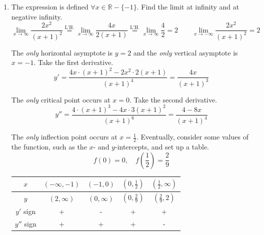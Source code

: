 \documentclass[a4paper, 12pt]{article}
\begin{document}
\begin{enumerate}[leftmargin=*,label=\textbf{\arabic*.}]
\begin{enumerate}[leftmargin=*,label=\textbf{\arabic*.}]
If $\displaystyle \ln(L)=-\frac16$, then $\boxed{L= e^{\textstyle-\frac16}}$.
\begin{enumerate}[leftmargin=*,label=\textbf{\alph*.}]
\item Rewrite the equation: $\dfrac xy=\cos(\pi xy)\implies x=y\cos(\pi xy)$.

Differentiate each side.
\[1=y'\cdot\cos(\pi xy)+y\cdot(-\sin(\pi xy))\cdot\pi(1\cdot y+xy')\]
\[1=y'\cos(\pi xy)-\pi y^2\sin(\pi xy)-\pi xyy'\sin(\pi xy)\]
\[1+\pi y^2\sin(\pi xy)=y'\left[\cos(\pi xy)-\pi xy\sin(\pi xy)\right]\]
\[y'=\frac{1+\pi y^2\sin(\pi xy)}{\cos(\pi xy)-\pi xy\sin(\pi xy)}\]

Calculate $y'$ at the point $(-1,1)$.
\[y' = \frac{1+\pi\cdot\sin(-\pi)}{\cos(-\pi)+\pi\sin(-\pi)}=-1\]

Recall the tangent line formula: $y-y_0=m(x-x_0)$, where $m$ is basically the derivative at the point $(-1,1)$. The tangent line is as follows.

\[y-1=-1(x+1)\implies\boxed{y=-x}\]
\end{enumerate}

\item The expression is defined $\forall x\in \mathbb{R}- \{-1\}$. Find the limit at infinity and at negative infinity.
\[\lim_{x\to\infty}\frac{2x^2}{(x+1)^2}\overset{\text{L'H.}}{=}\lim_{x\to\infty}\frac{4x}{2(x+1)}\overset{\text{L'H.}}{=}\lim_{x\to\infty}\frac42=2\quad\quad\lim_{x\to-\infty}\frac{2x^2}{(x+1)^2}=2\]

The \textit{only} horizontal asymptote is $y=2$ and the \textit{only} vertical asymptote is $x=-1$. Take the first derivative.
\[y'=\frac{4x\cdot(x+1)^2-2x^2\cdot2(x+1)}{(x+1)^4}=\frac{4x}{(x+1)^3}\]

The \textit{only} critical point occurs at $x=0$. Take the second derivative.
\[y''=\frac{4\cdot(x+1)^3-4x\cdot3(x+1)^2}{(x+1)^6}=\frac{4-8x}{(x+1)^4}\]

The \textit{only} inflection point occurs at $x=\frac12$. Eventually, consider some values of the function, such as the $x$- and $y$-intercepts, and set up a table.
\[f(0) = 0, \quad f\left(\frac12\right)=\frac29\]

\begin{center}
    \begin{tabular}{ |c| c c c c| } 
    \hline
        $x$ & $(-\infty,-1)$ & $(-1,0)$ & $\left(0,\frac12\right)$ & $\left(\frac12,\infty\right)$ \\
        \hline
        $y$ & $(2,\infty)$ & $(0,\infty)$ & $\left(0,\frac29\right)$ & $\left(\frac29,2\right)$ \\
        \hline
        $y'$ sign & + & - & + & + \\
        \hline
        $y''$ sign & + & + & + & - \\
        \hline
    \end{tabular}
\end{center}


\end{enumerate}
\end{enumerate}
\end{document}

